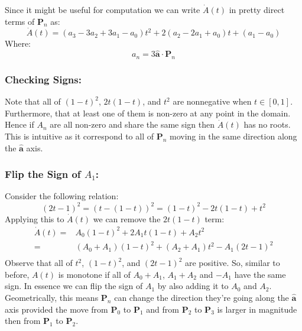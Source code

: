 Since it might be useful for computation we can write $\dot{A}(t)$ in pretty direct terms of $\mathbf{P}_n$ as:
\[\dot{A}(t) = (a_3-3a_2+3a_1-a_0)t^2+2(a_2-2a_1+a_0)t+(a_1-a_0)\]
Where:
\[a_n = 3\hat{\mathbf{a}}\cdot\mathbf{P}_n\]

\subsubsection{Checking Signs:}
Note that all of $(1-t)^2$, $2t(1-t)$, and $t^2$ are nonnegative when $t\in[0,1]$.
Furthermore,
that at least one of them is non-zero at any point in the domain.
Hence if $A_n$ are all non-zero and share the same sign then $\dot{A}(t)$ has no roots.
This is intuitive as it correspond to all of $\mathbf{P}_n$ moving in the same direction along the $\hat{\mathbf{a}}$ axis.

\subsubsection{Flip the Sign of $A_1$:}
Consider the following relation:
\[(2t-1)^2 = (t-(1-t))^2= (1-t)^2-2t(1-t)+t^2\]
Applying this to $\dot{A}(t)$ we can remove the $2t(1-t)$ term:
\[\begin{aligned}
	\dot{A}(t) =& A_0(1-t)^2+2A_1t(1-t)+A_2t^2\\
	=&(A_0+A_1)(1-t)^2+(A_2+A_1)t^2-A_1(2t-1)^2\\
\end{aligned}\]
Observe that all of $t^2$, $(1-t)^2$, and $(2t-1)^2$ are positive.
So,
similar to before,
$A(t)$ is monotone if all of $A_0+A_1$, $A_1+A_2$ and $-A_1$ have the same sign.
In essence we can flip the sign of $A_1$ by also adding it to $A_0$ and $A_2$.
\\

Geometrically,
this means $\mathbf{P}_n$ can change the direction they're going along the $\hat{\mathbf{a}}$ axis provided the move from $\mathbf{P}_0$ to $\mathbf{P}_1$ and from $\mathbf{P}_2$ to $\mathbf{P}_3$ is larger in magnitude then from $\mathbf{P}_1$ to $\mathbf{P}_2$.

%
